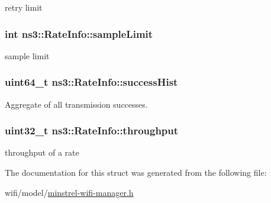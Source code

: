 retry limit 

\subsubsection[{\texorpdfstring{sample\+Limit}{sampleLimit}}]{\setlength{\rightskip}{0pt plus 5cm}int ns3\+::\+Rate\+Info\+::sample\+Limit}\hypertarget{structns3_1_1RateInfo_a97037d11aa3723b04bf3f319a398de2f}{}\label{structns3_1_1RateInfo_a97037d11aa3723b04bf3f319a398de2f}


sample limit 

\subsubsection[{\texorpdfstring{success\+Hist}{successHist}}]{\setlength{\rightskip}{0pt plus 5cm}uint64\+\_\+t ns3\+::\+Rate\+Info\+::success\+Hist}\hypertarget{structns3_1_1RateInfo_ac5b5bd34d0f4f11dd0a82210bb15005f}{}\label{structns3_1_1RateInfo_ac5b5bd34d0f4f11dd0a82210bb15005f}


Aggregate of all transmission successes. 

\subsubsection[{\texorpdfstring{throughput}{throughput}}]{\setlength{\rightskip}{0pt plus 5cm}uint32\+\_\+t ns3\+::\+Rate\+Info\+::throughput}\hypertarget{structns3_1_1RateInfo_acd9afc412f2d9c5573eb9bc3a00412b5}{}\label{structns3_1_1RateInfo_acd9afc412f2d9c5573eb9bc3a00412b5}


throughput of a rate 



The documentation for this struct was generated from the following file\+:\begin{DoxyCompactItemize}
\item 
wifi/model/\hyperlink{minstrel-wifi-manager_8h}{minstrel-\/wifi-\/manager.\+h}\end{DoxyCompactItemize}
